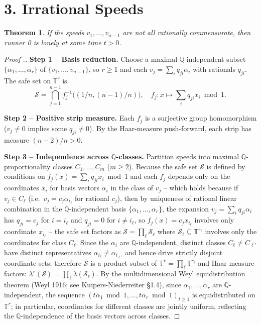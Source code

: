 \documentclass[11pt,a4paper]{article}
\theoremstyle{plain}
\newtheorem{theorem}{Theorem}[section]
\theoremstyle{definition}
\theoremstyle{remark}
\begin{document}
\medskip



\section{3. Irrational Speeds}



\begin{theorem}
If the speeds $v_1, \ldots, v_{n-1}$ are not all rationally commensurate, then runner 0 is lonely at some time $t > 0$.

\end{theorem}

\begin{proof}[Proof .]

\textbf{Step 1 -- Basis reduction.} Choose a maximal $\mathbb{Q}$-independent subset $\{\alpha_1, \ldots, \alpha_r\}$ of $\{v_1, \ldots, v_{n-1}\}$, so $r \geq 1$ and each $v_j = \sum_i q_{ji}\alpha_i$ with rationals $q_{ji}$. The safe set on $\mathbb{T}^r$ is
\[\mathcal{S} = \bigcap_{j=1}^{n-1} f_j^{-1}\!\bigl((1/n, (n-1)/n)\bigr), \quad f_j : x \mapsto \sum_i q_{ji}x_i \bmod 1.\]

\textbf{Step 2 -- Positive strip measure.} Each $f_j$ is a surjective group homomorphism ($v_j \neq 0$ implies some $q_{ji} \neq 0$). By the Haar-measure push-forward, each strip has measure $(n-2)/n > 0$.

\textbf{Step 3 -- Independence across $\mathbb{Q}$-classes.} Partition speeds into maximal $\mathbb{Q}$-proportionality classes $C_1, \ldots, C_m$ ($m \geq 2$). Because the safe set $\mathcal{S}$ is defined by conditions on $f_j(x) = \sum_i q_{ji} x_i \bmod 1$ and each $f_j$ depends only on the coordinates $x_i$ for basis vectors $\alpha_i$ in the class of $v_j$ -- which holds because if $v_j \in C_\ell$ (i.e.\ $v_j = c_j\alpha_{i_\ell}$ for rational $c_j$), then by uniqueness of rational linear combination in the $\mathbb{Q}$-independent basis $\{\alpha_1,\ldots,\alpha_r\}$, the expansion $v_j = \sum_i q_{ji}\alpha_i$ has $q_{ji} = c_j$ for $i = i_\ell$ and $q_{ji} = 0$ for $i \neq i_\ell$, so $f_j(x) = c_j x_{i_\ell}$ involves only coordinate $x_{i_\ell}$ -- the safe set factors as $\mathcal{S} = \prod_\ell \mathcal{S}_\ell$ where $\mathcal{S}_\ell \subseteq \mathbb{T}^{r_\ell}$ involves only the coordinates for class $C_\ell$. Since the $\alpha_i$ are $\mathbb{Q}$-independent, distinct classes $C_\ell \neq C_{\ell'}$ have distinct representatives $\alpha_{i_\ell} \neq \alpha_{i_{\ell'}}$ and hence drive strictly disjoint coordinate sets; therefore $\mathcal{S}$ is a product subset of $\mathbb{T}^r = \prod_\ell \mathbb{T}^{r_\ell}$ and Haar measure factors: $\lambda^r(\mathcal{S}) = \prod_\ell \lambda(\mathcal{S}_\ell)$. By the multidimensional Weyl equidistribution theorem (Weyl 1916; see Kuipers-Niederreiter §1.4), since $\alpha_1, \ldots, \alpha_r$ are $\mathbb{Q}$-independent, the sequence $(t\alpha_1 \bmod 1, \ldots, t\alpha_r \bmod 1)_{t \geq 1}$ is equidistributed on $\mathbb{T}^r$; in particular, coordinates for different classes are jointly uniform, reflecting the $\mathbb{Q}$-independence of the basis vectors across classes.


\end{proof}
\end{document}
